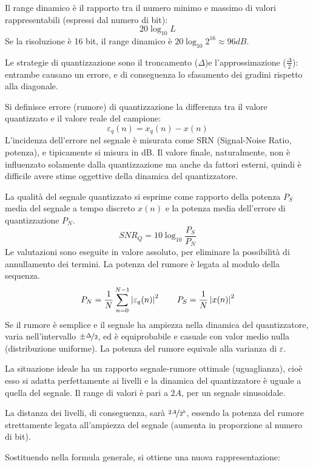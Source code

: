 Il range dinamico è il rapporto tra il numero minimo e massimo di valori rappresentabili (espressi dal numero di bit):
$$20\log_{10} L$$
Se la risoluzione è 16 bit, il range dinamico è $20\log_{10} 2^{16} \approx 96 dB$.

Le strategie di quantizzazione sono il troncamento ($\Delta$)e l'approssimazione ($\frac{\Delta}{2}$): entrambe causano un errore, e di conseguenza lo sfasamento dei gradini rispetto alla diagonale. 

Si definisce errore (rumore) di quantizzazione la differenza tra il valore quantizzato e il valore reale del campione:
$$\varepsilon_q(n) = x_q(n) - x(n)$$
L'incidenza dell'errore nel segnale è misurata come SRN (Signal-Noise Ratio, potenza), e tipicamente si misura in dB. Il valore finale, naturalmente, non è influenzato solamente dalla quantizzazione ma anche da fattori esterni, quindi è difficile avere stime oggettive della dinamica del quantizzatore.

La qualità del segnale quantizzato si esprime come rapporto della potenza $P_S$ media del segnale a tempo discreto $x(n)$ e la potenza media dell'errore di quantizzazione $P_N$.
$$SNR_Q = 10\log_{10}\frac{P_S}{P_N}$$
Le valutazioni sono eseguite in valore assoluto, per eliminare la possibilità di annullamento dei termini. La potenza del rumore è legata al modulo della sequenza. 
$$P_N = \frac{1}{N}\sum_{n=0}^{N-1}\left|\varepsilon_q(n)\right|^2 \qquad P_S = \frac{1}{N}\left|x(n)\right|^2$$
Se il rumore è semplice e il segnale ha ampiezza nella dinamica del quantizzatore, varia nell'intervallo $\pm \nicefrac{\Delta}{2}$, ed è equiprobabile e casuale con valor medio nulla (distribuzione uniforme). La potenza del rumore equivale alla varianza di $\varepsilon$.

La situazione ideale ha un rapporto segnale-rumore ottimale (uguaglianza), cioè esso si adatta perfettamente ai livelli e la dinamica del quantizzatore è uguale a quella del segnale. Il range di valori è pari a $2A$, per un segnale sinusoidale.


La distanza dei livelli, di conseguenza, sarà $\nicefrac{2A}{2^b}$, essendo la potenza del rumore strettamente legata all'ampiezza del segnale (aumenta in proporzione al numero di bit).

Sostituendo nella formula generale, si ottiene una nuova rappresentazione: 

